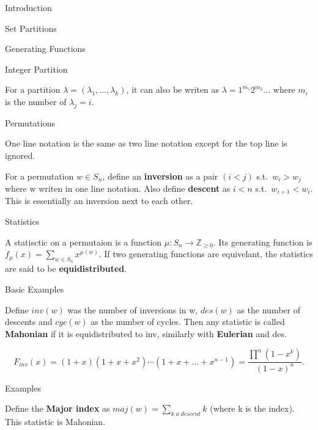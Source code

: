 \documentclass[12pt, letterpaper]{article}
\newcommand{\Z}{\mathbb{Z}}
\begin{document}
\begin{section}{Introduction}
\begin{subsection}{Set Partitions}
\begin{subsubsection}{Generating Functions}
    \end{subsubsection}

    \begin{subsubsection}{Integer Partition}

      For a partition \(\lambda = (\lambda_{1}, \dots, \lambda_{k})\), it can
      also be writen as \(\lambda = 1^{m_{1}} 2^{m_{2}} \dots\) where \(m_{i}\)
      is the number of \(\lambda_{j} = i\).

    \end{subsubsection}

  \end{subsection}

\end{section}

\begin{section}{Permutations}

  One line notation is the same as two line notation except for the top line is
  ignored.

  For a permutation \(w \in S_{n}\), define an \textbf{inversion} as a pair
  \((i < j)\) s.t.\ \(w_{i} > w_{j}\) where w writen in one line notation. Also
  define \textbf{descent} as \(i < n\) s.t.\ \(w_{i + 1} < w_{i}\). This is
  essentially an inversion next to each other.

  \begin{subsection}{Statistics}

    A statisctic on a permutaion is a function \(\mu: S_{n} \to \Z_{\geq 0}\).
    Its generating function is \(f_{\mu}(x) = \sum_{w \in S_{n}} x^{\mu(w)}\).
    If two generating functions are equivelant, the statistics are said to be
    \textbf{equidistributed}.

    \begin{subsubsection}{Basic Examples}

      Define \(inv(w)\) was the number of inversions in w, \(des(w)\) as the
      number of descents and \(cyc(w)\) as the number of cycles. Then any
      statistic is called \textbf{Mahonian} if it is equidistributed to inv,
      similarly with \textbf{Eulerian} and des.

      \[F_{inv}(x) = (1 + x)(1 + x + x^{2}) \cdots (1 + x + \dots + x^{n - 1}) =
        \frac{\prod^{n} (1 - x^{k})}{(1-x)^{n}}.\]

    \end{subsubsection}

    \begin{subsubsection}{Examples}

      Define the \textbf{Major index} as
      \(maj(w) = \sum _{k \; a \; descent} k\)
      (where k is the index). This statistic is Mahonian.


\end{subsubsection}
\end{subsection}
\end{section}
\end{document}
